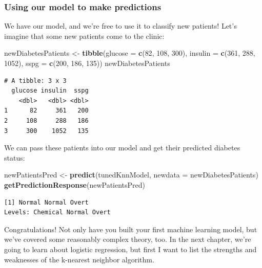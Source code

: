 \documentclass[
]{article}
\newenvironment{Shaded}{\begin{snugshade}}{\end{snugshade}}
\newcommand{\AttributeTok}[1]{\textcolor[rgb]{0.13,0.29,0.53}{#1}}
\newcommand{\DecValTok}[1]{\textcolor[rgb]{0.00,0.00,0.81}{#1}}
\newcommand{\FunctionTok}[1]{\textcolor[rgb]{0.13,0.29,0.53}{\textbf{#1}}}
\newcommand{\NormalTok}[1]{#1}
\newcommand{\OtherTok}[1]{\textcolor[rgb]{0.56,0.35,0.01}{#1}}
\begin{document}
\subsubsection{Using our model to make
predictions}\label{using-our-model-to-make-predictions}

We have our model, and we're free to use it to classify new patients!
Let's imagine that some new patients come to the clinic:

\begin{Shaded}
\begin{Highlighting}[]
\NormalTok{newDiabetesPatients }\OtherTok{\textless{}{-}} \FunctionTok{tibble}\NormalTok{(}\AttributeTok{glucose =} \FunctionTok{c}\NormalTok{(}\DecValTok{82}\NormalTok{, }\DecValTok{108}\NormalTok{, }\DecValTok{300}\NormalTok{),}
                              \AttributeTok{insulin =} \FunctionTok{c}\NormalTok{(}\DecValTok{361}\NormalTok{, }\DecValTok{288}\NormalTok{, }\DecValTok{1052}\NormalTok{),}
                              \AttributeTok{sspg =} \FunctionTok{c}\NormalTok{(}\DecValTok{200}\NormalTok{, }\DecValTok{186}\NormalTok{, }\DecValTok{135}\NormalTok{))}
\NormalTok{newDiabetesPatients}
\end{Highlighting}
\end{Shaded}

\begin{verbatim}
# A tibble: 3 x 3
  glucose insulin  sspg
    <dbl>   <dbl> <dbl>
1      82     361   200
2     108     288   186
3     300    1052   135
\end{verbatim}

We can pass these patients into our model and get their predicted
diabetes status:

\begin{Shaded}
\begin{Highlighting}[]
\NormalTok{newPatientsPred }\OtherTok{\textless{}{-}} \FunctionTok{predict}\NormalTok{(tunedKnnModel, }
                           \AttributeTok{newdata =}\NormalTok{ newDiabetesPatients)}
\FunctionTok{getPredictionResponse}\NormalTok{(newPatientsPred)}
\end{Highlighting}
\end{Shaded}

\begin{verbatim}
[1] Normal Normal Overt 
Levels: Chemical Normal Overt
\end{verbatim}

Congratulations! Not only have you built your first machine learning
model, but we've covered some reasonably complex theory, too. In the
next chapter, we're going to learn about logistic regression, but first
I want to list the strengths and weaknesses of the k-nearest neighbor
algorithm.
\end{document}
